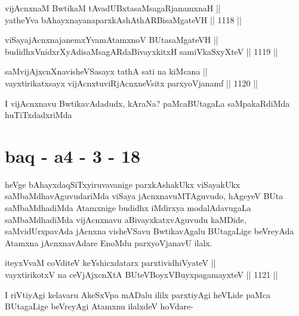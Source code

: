 
\begin{shl}
vijAcnxnaM BwtikaM tAvadUBxtasaMsagaRjanamxnaH || \\
yatheYva bAhayxnayanaparxkAshAthARBisaMgateVH \hfill || 1118 ||  
\end{shl}
				
\begin{shl}
viSayajAcnxnajanemxYvamAtamxnoV BUtasaMgateVH || \\
budidhxVnidxrXyAdisaMsagARdaBivayxkitxH samiVkaSxyXteV \hfill || 1119 || 
\end{shl}
				
\begin{shl}
saMvijAjxcnXnavisheVSasayx tathA sati na kiMcana || \\
vayxtirikatxsayx vijAcnxtuviRjAcnxneV\s sitx parxyoVjanamf \hfill || 1120 ||  
\end{shl}

\begin{artha}
I vijAcnxnavu BwtikavAdadudx, kAraNa? paMcaBUtagaLa saMpakaRdiMda huTiTxdadxriMda
\end{artha}

\section*{baq - a4 - 3 - 18}


\begin{artha}
heVge bAhayxdaqSiTxyiruvavanige parxkAshakUkx viSayakUkx saMbaMdhavAguvudariMda viSaya jAcnxnavuMTAguvudo, hAgeyeV BUta saMbaMdhadiMda Atamxnige budidhx iMdirxya modalAdavugaLa saMbaMdhadiMda vijAcnxnavu aBivayxkatxvAguvudu kaMDide, saMvidUrxpavAda jAcnxna visheVSavu BwtikavAgalu BUtagaLige beVreyAda Atamxna jAcnxnavAdare EnoMdu parxyoVjanavU ilalx.
\end{artha}


\begin{shl}
iteyxVvaM coVditeV keYshicxdatarx parxtividhiVyateV || \\
vayxtirikotxV na ceVjAjxcnXtA BUteVBoyxV\s BuyxpagamayxteV \hfill || 1121 ||  
\end{shl}

\begin{artha}
I riVtiyAgi kelavaru AkeSxVpa mADalu ililx parxtiyAgi heVLide paMca BUtagaLige beVreyAgi Atamxnu ilalxdeV hoVdare-
\end{artha}

